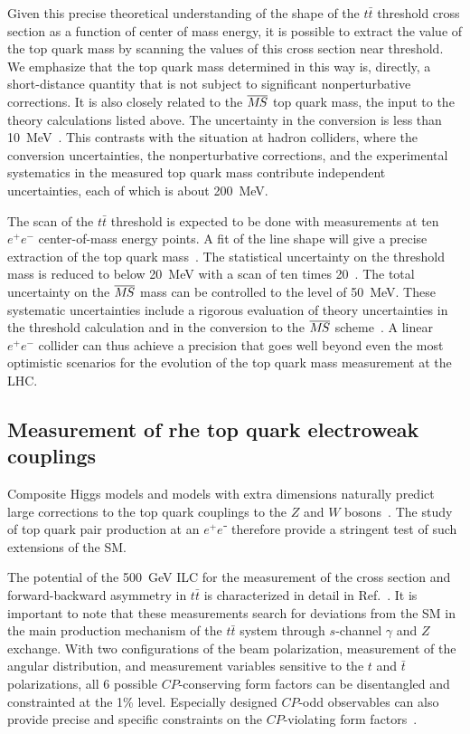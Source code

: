Given this precise theoretical understanding of the shape of the
$t\bar t$ threshold cross section as a function of center of mass
energy, it is possible to extract the value of the top quark mass by
scanning the values of  this cross section near threshold.  We
emphasize that the top quark mass determined in this way is, directly,
a short-distance quantity that is not subject to significant
nonperturbative corrections.
It is also closely related to the $\msb$ top quark mass, the input to
the theory calculations listed above. The uncertainty in the
conversion is less than 10~MeV~\cite{Marquard:2015qpa}.  This
contrasts with the situation at hadron colliders, where the
conversion uncertainties, the nonperturbative corrections, and the
experimental systematics in the measured top quark mass
contribute  independent uncertainties, each of which is about
200~MeV. 

The scan of the $t\bar t$ threshold is expected to be done with
measurements at ten $e^+e^-$
center-of-mass energy points. A fit of the line shape will give
a precise extraction of the top quark mass~\cite{Martinez:2002st,Horiguchi:2013wra,Seidel:2013sqa}.
The statistical uncertainty on the threshold mass is reduced to below 20~MeV with a scan of
ten times 20~\ifb. The total uncertainty on the $\msb$ mass can be controlled to the level
of 50~MeV.   These systematic uncertainties
include a rigorous evaluation of theory uncertainties in the threshold calculation and in the conversion
to the $\msb$ scheme~\cite{Simon:2016pwp}. A linear $e^+e^-$ collider
can thus achieve a precision that goes well beyond
even the most optimistic scenarios for the evolution 
of the top quark mass measurement at the LHC.


\subsection{Measurement of rhe top quark electroweak couplings}
\label{subsec:top:topelectroweak}

Composite Higgs models and models with extra dimensions naturally
predict  large corrections to the top quark couplings to the $Z$ and
$W$ bosons~\cite{Richard:2014upa,Barducci:2015aoa,Durieux:2018ekg}.
The study of top quark pair production at an $e^+e⁻$ therefore provide
a stringent test of such extensions of the SM.

The potential of the 500~GeV ILC for the measurement of the cross section and forward-backward asymmetry in
$t\bar{t}$ is characterized in detail in Ref.~\cite{Amjad:2015mma}. It
is important to note that these measurements search for deviations
from the SM in the main production mechanism of the $t\bar t$ system
through $s$-channel $\gamma$ and $Z$ exchange.   With two
configurations of the beam polarization, measurement of the angular
distribution, and measurement variables sensitive to the $t$ and $\bar
t$ polarizations, all 6 possible $CP$-conserving form factors can be
disentangled and constrainted at the 1\% level. 
Especially designed $CP$-odd observables can also provide precise and
specific constraints on the $CP$-violating form factors~\cite{Bernreuther:2017cyi}. 


